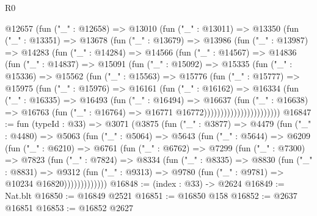 \begin{lexlean}{R0}
\begin{coremodule}
            @12657
              (fun ("_" : @12658) =>
              @13010
                (fun ("_" : @13011) =>
                @13350
                  (fun ("_" : @13351) =>
                  @13678
                    (fun ("_" : @13679) =>
                    @13986
                      (fun ("_" : @13987) =>
                      @14283
                        (fun ("_" : @14284) =>
                        @14566
                          (fun ("_" : @14567) =>
                          @14836
                            (fun ("_" : @14837) =>
                            @15091
                              (fun ("_" : @15092) =>
                              @15335
                                (fun ("_" : @15336) =>
                                @15562
                                  (fun ("_" : @15563) =>
                                  @15776
                                    (fun ("_" : @15777) =>
                                    @15975
                                      (fun ("_" : @15976) =>
                                      @16161
                                        (fun ("_" : @16162) =>
                                        @16334
                                          (fun ("_" : @16335) =>
                                          @16493
                                            (fun ("_" : @16494) =>
                                            @16637
                                              (fun ("_" : @16638) =>
                                              @16763
                                                (fun ("_" : @16764) =>
                                                @16771 @16772)))))))))))))))))))))))
@16847 := fun (typeId : @33) =>
  @3071
    (@3875
      (fun ("_" : @3877) =>
      @4479
        (fun ("_" : @4480) =>
        @5063
          (fun ("_" : @5064) =>
          @5643
            (fun ("_" : @5644) =>
            @6209
              (fun ("_" : @6210) =>
              @6761
                (fun ("_" : @6762) =>
                @7299
                  (fun ("_" : @7300) =>
                  @7823
                    (fun ("_" : @7824) =>
                    @8334
                      (fun ("_" : @8335) =>
                      @8830
                        (fun ("_" : @8831) =>
                        @9312
                          (fun ("_" : @9313) =>
                          @9780 (fun ("_" : @9781) => @10234 @16820)))))))))))))
@16848 := (index : @33) -> @2624
@16849 := Nat.blt
@16850 := @16849 @2521
@16851 := @16850 @158
@16852 := @2637 @16851
@16853 := @16852 @2627

\end{coremodule}
\end{lexlean}
